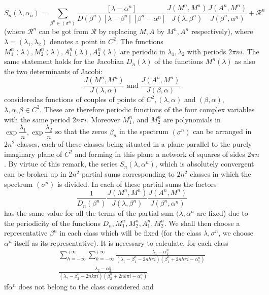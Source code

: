 $$
S_n (\lambda, \alpha_n) = \sum_{\beta^n \in (\sigma^n)} \frac{[\lambda
    - \alpha^n]}{D(\beta^n)[\lambda - \beta^n][\beta^n - \alpha^n]}
\frac{J(M^n,M^n)}{J(\lambda,\beta^n)}
\frac{J(A^n,M^n)}{J(\beta^n,\alpha^n)} + \mathscr{R}^n 
$$
(where $\mathscr{R}^n$ can be got from $\mathscr{R}$ by replacing
$M,A$ by $M^n,A^n$ respectively), where $\lambda = (\lambda_1,
\lambda_2)$ denotes a point in $C^2$. The functions \break $M^n_1 (\lambda),
M^n_2(\lambda),A^n_1(\lambda), A^n_2(\lambda)$ are periodic in
$\lambda_1,\lambda_2$ with periods $2 \pi ni$. The same statement
holds for the Jacobian $D_n(\lambda)$ of the functions $M^n(\lambda)$
as also the two determinants of Jacobi: 
$$
\frac{J(M^n,M^n)}{J(\lambda,\alpha)} \text{ and }
\frac{J(A^n,M^n)}{J(\beta,\alpha)} 
$$
considered\pageoriginale as functions of couples of points of $C^2, (\lambda,
\alpha)$ and $(\beta,\alpha)$, $\lambda, \alpha, \beta \in C^2$. These
are therefore periodic functions of the four complex variables with
the same period $2n \pi i$. Moreover $M^n_1$, and $M^n_2$ are
polynomials in $\exp \dfrac{\lambda_1}{n}, \exp \dfrac{\lambda_2}{n}$
so that the zeros $\beta_n$ in the spectrum $(\sigma^n)$ can be
arranged in $2n^2$ classes, each of these classes being situated in a
plane parallel to the purely imaginary plane of $C^2$ and forming in
this plane a network of squares of sides $2 \pi n$. By virtue of this
remark, the series $S_n(\lambda,\alpha^n)$, which is absolutely
convergent can be broken up in $2n^2$ partial sums corresponding to
$2n^2$ classes in which the spectrum $(\sigma^n)$ is divided. In each
of these partial sums the factors 
$$
\frac{1}{D_n(\beta^n)} \frac{J(M^n,M^n)}{J(\lambda,\beta^n)}
\frac{J(A^n,M^n)}{J(\beta^n,\alpha^n)} 
$$
has the same value for all the terms of the partial sum $(\lambda,
\alpha^n$ are fixed) due to the periodicity of the functions
$D_n,M^n_1,M^n_2, A^n_1, M^n_2$. We shall then choose a representative
$\beta^n$  in each class which will be fixed (for the class $\lambda,
\sigma^n$, we choose $\alpha^n$ itself as its representative). It is
necessary to calculate, for each class 
\begin{multline*}
  \sum_{h = - \infty}^{+ \infty} \sum_{k = - \infty}^{+ \infty}
  \frac{\lambda_1 - \alpha^n_1}{(\lambda_1- \beta^n_1 - 2nh \pi
    i)(\beta^n_1 + 2nh \pi i - \alpha^n_1)}\\ 
  \frac{\lambda_2 -
    \alpha_2^n}{(\lambda_2 - \beta_2^n - 2nk \pi i)(\beta^n_2 + 2n k \pi i
    - \alpha^n_2)} 
\end{multline*}
if\pageoriginale $\alpha^n$ does not belong to the class considered and 
